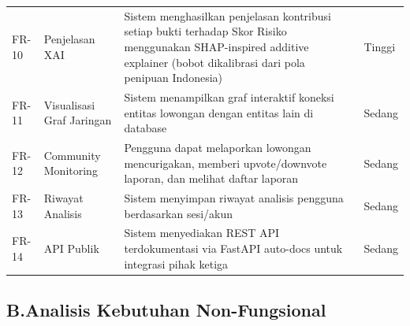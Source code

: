 \documentclass[12pt,a4paper]{article}
\begin{document}
\begin{adjustwidth}{0.50cm}{0pt}
\begin{table}[H]
\begin{tabularx}{\linewidth}{@{}p{1.2cm}p{3.0cm}Yp{1.6cm}@{}}
FR-10 & Penjelasan XAI & Sistem menghasilkan penjelasan kontribusi setiap bukti terhadap Skor Risiko menggunakan SHAP-inspired additive explainer (bobot dikalibrasi dari pola penipuan Indonesia) & Tinggi \\
FR-11 & Visualisasi Graf Jaringan & Sistem menampilkan graf interaktif koneksi entitas lowongan dengan entitas lain di database & Sedang \\
FR-12 & Community Monitoring & Pengguna dapat melaporkan lowongan mencurigakan, memberi upvote/downvote laporan, dan melihat daftar laporan & Sedang \\
FR-13 & Riwayat Analisis & Sistem menyimpan riwayat analisis pengguna berdasarkan sesi/akun & Sedang \\
FR-14 & API Publik & Sistem menyediakan REST API terdokumentasi via FastAPI auto-docs untuk integrasi pihak ketiga & Sedang \\
\bottomrule
\end{tabularx}
\end{table}
\end{adjustwidth}

\subsection*{B.\quad Analisis Kebutuhan Non-Fungsional}
\end{document}
